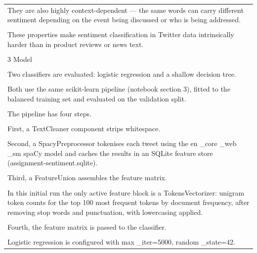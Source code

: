 \documentclass[11pt]{article}
\begin{document}
\begin{longtable}{|p{\dimexpr\linewidth-2\tabcolsep-2\arrayrulewidth\relax}|}
\hline
\rule{0pt}{3.5cm} \\
\hline
They are also highly context-dependent --- the same words can carry different sentiment depending on the event being discussed or who is being addressed. \\[2pt]
\hline
\rule{0pt}{3.5cm} \\
\hline
These properties make sentiment classification in Twitter data intrinsically harder than in product reviews or news text. \\[2pt]
\hline
\rule{0pt}{3.5cm} \\
\hline
3 Model \\[2pt]
\hline
\rule{0pt}{3.5cm} \\
\hline
Two classifiers are evaluated: logistic regression and a shallow decision tree. \\[2pt]
\hline
\rule{0pt}{3.5cm} \\
\hline
Both use the same scikit-learn pipeline (notebook section 3), fitted to the balanced training set and evaluated on the validation split. \\[2pt]
\hline
\rule{0pt}{3.5cm} \\
\hline
The pipeline has four steps. \\[2pt]
\hline
\rule{0pt}{3.5cm} \\
\hline
First, a TextCleaner component strips whitespace. \\[2pt]
\hline
\rule{0pt}{3.5cm} \\
\hline
Second, a SpacyPreprocessor tokenises each tweet using the en \_core \_web \_sm spaCy model and caches the results in an SQLite feature store (assignment-sentiment.sqlite). \\[2pt]
\hline
\rule{0pt}{3.5cm} \\
\hline
Third, a FeatureUnion assembles the feature matrix. \\[2pt]
\hline
\rule{0pt}{3.5cm} \\
\hline
In this initial run the only active feature block is a TokensVectorizer: unigram token counts for the top 100 most frequent tokens by document frequency, after removing stop words and punctuation, with lowercasing applied. \\[2pt]
\hline
\rule{0pt}{3.5cm} \\
\hline
Fourth, the feature matrix is passed to the classifier. \\[2pt]
\hline
\rule{0pt}{3.5cm} \\
\hline
Logistic regression is configured with max \_iter=5000, random \_state=42. \\[2pt]

\end{longtable}
\end{document}
